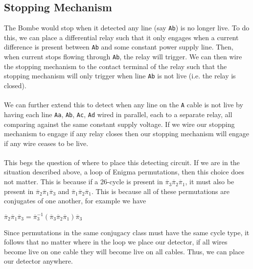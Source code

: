 \subsection{Stopping Mechanism}
The Bombe would stop when it detected
any line (say \texttt{Ab}) is no longer live. To do this, we can
place a differential
relay such that it only engages when a current difference is present
between \texttt{Ab} and some constant power supply line. Then, when
current stops
flowing through \texttt{Ab}, the relay will trigger. We can then wire the
stopping mechanism to the contact terminal of the relay such that the
stopping mechanism will only trigger when line \texttt{Ab} is not live (i.e.
the relay is closed).
\\\\We can further extend this to detect when any line on the \texttt{A}
cable is not live by having each line \texttt{Aa}, \texttt{Ab},
\texttt{Ac}, \texttt{Ad} wired in
parallel, each to a separate relay, all comparing against the same
constant supply voltage. If we wire our stopping mechanism to engage
if any relay closes
then our stopping mechanism will engage if any wire ceases to be live.
\\\\This begs the question of where to place this detecting circuit.
If we are in the situation described above, a loop of Enigma
permutations, then this choice does not matter. This is because if a
$26$-cycle is present in
$\overline\pi_3\overline\pi_2\overline\pi_1$, it must also
be present in
$\overline\pi_2\overline\pi_1\overline\pi_3$ and
$\overline\pi_1\overline\pi_2\overline\pi_1$. This is
because all of these permutations are conjugates of one another, for
example we have
\begin{center}
  $\overline\pi_2\overline\pi_1\overline\pi_3 =
  \overline\pi_3^{-1}(\overline\pi_3\overline\pi_2\overline\pi_1)\overline\pi_3$
\end{center}
Since permutations in the same conjugacy class must have the same
cycle type, it follows that no matter where in the loop we place our
detector, if all wires become live on one cable they will become live
on all cables. Thus, we can place our detector anywhere.


